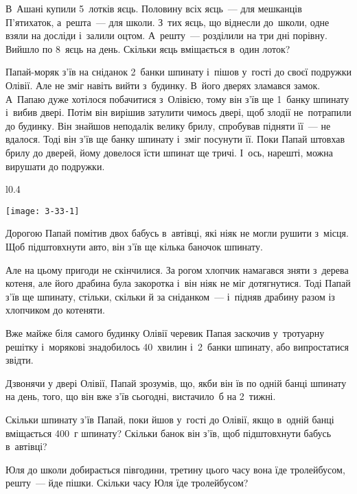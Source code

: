 \problem
В~Ашані купили 5~лотків яєць.
Половину всіх яєць~--- для мешканців П'ятихаток, а~решта~--- для школи.
З~тих яєць, що віднесли до~школи, одне взяли на досліди і~залили оцтом.
А~решту~--- розділили на три дні порівну. Вийшло по 8~яєць на день.
Скільки яєць вміщається в~один лоток? 


\problem
Папай-моряк з’їв на сніданок 2~банки шпинату і~пішов у~гості до своєї
подружки Олівії. Але не зміг навіть вийти з~будинку. В~його дверях
зламався замок. А~Папаю дуже хотілося побачитися з~Олівією, тому він
з’їв ще 1~банку шпинату і~вибив двері. Потім він вирішив затулити
чимось двері, щоб злодії не~потрапили до будинку. Він знайшов неподалік
велику брилу, спробував підняти її~--- не вдалося. Тоді він з’їв ще банку
шпинату і~зміг посунути її. Поки Папай штовхав брилу до дверей, йому
довелося їсти шпинат ще тричі. І~ось, нарешті, можна вирушати до подружки.

\begin{wrapfigure}{l}{0.4\textwidth}
  \vspace{-20pt}
  \begin{center}
    \texttt{[image: 3-33-1]}
  \end{center}
  \vspace{-20pt}
\end{wrapfigure}

Дорогою Папай помітив двох бабусь в~автівці, які ніяк не могли рушити
з~місця. Щоб підштовхнути авто, він з’їв ще кілька баночок шпинату.

Але на цьому пригоди не скінчилися. За рогом хлопчик намагався зняти
з~дерева котеня, але його драбина була закоротка і~він ніяк не міг
дотягнутися. Тоді Папай з’їв ще шпинату, стільки, скільки й
за сніданком~--- і~підняв драбину разом із хлопчиком до котеняти.

Вже майже біля самого будинку Олівії черевик Папая заскочив у~тротуарну
решітку і~морякові знадобилось 40~хвилин і~2~банки шпинату,
або випростатися звідти.

Дзвонячи у двері Олівії, Папай зрозумів, що, якби він їв по одній
банці шпинату на день, того, що він вже з’їв сьогодні,
вистачило~б на 2~тижні.

Скільки шпинату з’їв Папай, поки йшов у~гості до Олівії, якщо в~одній
банці вміщається 400~г шпинату?
Скільки банок він з’їв, щоб підштовхнути бабусь в~автівці?


\problem
Юля до школи добирається півгодини,
третину цього часу вона їде тролейбусом, решту~--- йде пішки.
Скільки часу Юля їде тролейбусом?


